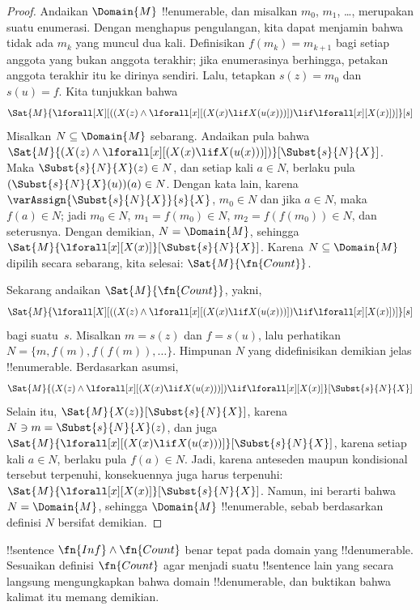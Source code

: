 \documentclass[../../../include/open-logic-section]{subfiles}
\begin{document}
\begin{proof}
Andaikan $\Domain{M}$ !!{enumerable}, dan misalkan $m_0$, $m_1$, \dots,
merupakan suatu enumerasi. Dengan menghapus pengulangan, kita dapat menjamin
bahwa tidak ada $m_k$ yang muncul dua kali. Definisikan
$f(m_k) = m_{k+1}$ bagi setiap anggota yang bukan anggota terakhir; jika
enumerasinya berhingga, petakan anggota terakhir itu ke dirinya sendiri.
Lalu, tetapkan $s(z) = m_0$ dan $s(u) = f$. Kita tunjukkan bahwa
\[
\Sat{M}{\lforall[X][((X(z) \land \lforall[x][(X(x) \lif X(u(x)))])
    \lif \lforall[x][X(x)])]}[s]
\]
Misalkan $N \subseteq \Domain{M}$ sebarang. Andaikan pula bahwa
$\Sat{M}{(X(z) \land \lforall[x][(X(x) \lif
X(u(x)))])}[\Subst{s}{N}{X}]$. Maka $\Subst{s}{N}{X}(z) \in N$, dan setiap
kali $a \in N$, berlaku pula $(\Subst{s}{N}{X}(u))(a) \in N$. Dengan kata
lain, karena $\varAssign{\Subst{s}{N}{X}}{s}{X}$, $m_0 \in N$ dan jika
$a \in N$, maka $f(a) \in N$; jadi $m_0 \in N$,
$m_1 = f(m_0) \in N$, $m_2 = f(f(m_0)) \in N$, dan seterusnya. Dengan
demikian, $N = \Domain{M}$, sehingga
$\Sat{M}{\lforall[x][X(x)]}[\Subst{s}{N}{X}]$. Karena
$N \subseteq \Domain{M}$ dipilih secara sebarang, kita selesai:
$\Sat{M}{\fn{Count}}$.

Sekarang andaikan $\Sat{M}{\fn{Count}}$, yakni,
\[
\Sat{M}{\lforall[X][((X(z) \land \lforall[x][(X(x) \lif X(u(x)))])
    \lif \lforall[x][X(x)])]}[s]
\]
bagi suatu~$s$. Misalkan $m = s(z)$ dan $f = s(u)$, lalu perhatikan
$N = \{m, f(m), f(f(m)), \dots\}$. Himpunan $N$ yang didefinisikan demikian
jelas !!{enumerable}. Berdasarkan asumsi,
\[
\Sat{M}{(X(z) \land \lforall[x][(X(x) \lif X(u(x)))])
    \lif \lforall[x][X(x)]}[\Subst{s}{N}{X}]
\]
Selain itu, $\Sat{M}{X(z)}[\Subst{s}{N}{X}]$, karena
$N \ni m = \Subst{s}{N}{X}(z)$, dan juga
$\Sat{M}{\lforall[x][(X(x) \lif X(u(x)))]}[\Subst{s}{N}{X}]$, karena setiap
kali $a \in N$, berlaku pula $f(a) \in N$. Jadi, karena anteseden maupun
kondisional tersebut terpenuhi, konsekuennya juga harus terpenuhi:
$\Sat{M}{\lforall[x][X(x)]}[\Subst{s}{N}{X}]$. Namun, ini berarti bahwa
$N = \Domain{M}$, sehingga $\Domain{M}$ !!{enumerable}, sebab berdasarkan
definisi $N$ bersifat demikian.
\end{proof}

\begin{prob}
!!{sentence} $\fn{Inf} \land \fn{Count}$ benar tepat pada domain yang
!!{denumerable}. Sesuaikan definisi $\fn{Count}$ agar menjadi
suatu !!{sentence} lain yang secara langsung mengungkapkan bahwa domain
!!{denumerable}, dan buktikan bahwa kalimat itu memang demikian.
\end{prob}
\end{document}
